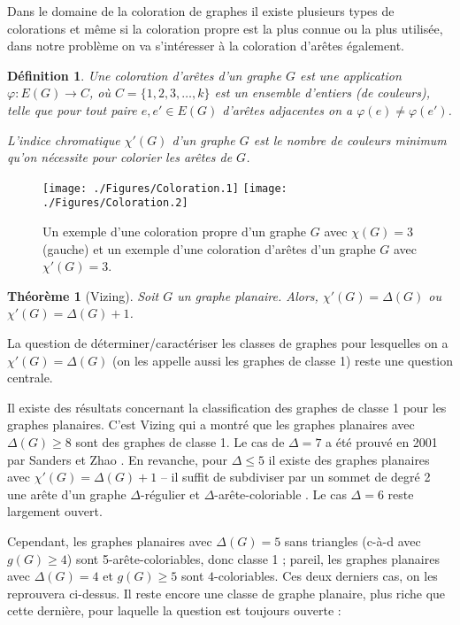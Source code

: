 \documentclass[10pt,a4paper]{article}
\newtheorem{definition}{Définition}
\newtheorem{theorem}{Théorème}
\begin{document}
Dans le domaine de la coloration de graphes il existe plusieurs types de colorations et même si la coloration propre est la plus connue ou la plus utilisée, dans notre problème on va s'intéresser à la coloration d'arêtes également.

\begin{definition}%
Une \emph{coloration d'arêtes} d'un graphe $G$ est une application $\varphi: E(G) \to C$, où $C=\{1,2,3,\dots,k\}$ est un ensemble d'entiers (de \emph{couleurs}), telle que pour tout paire $e, e' \in E(G)$ d'arêtes adjacentes on a $\varphi(e) \neq \varphi(e')$.

L'\emph{indice chromatique} $\chi'(G)$ d'un graphe $G$ est le nombre de couleurs minimum qu'on nécessite pour colorier les arêtes de $G$.
\end{definition}

\begin{figure}[ht]
\centerline{
\texttt{[image: ./Figures/Coloration.1]}
\hfil
\texttt{[image: ./Figures/Coloration.2]}
}
\caption{Un exemple d'une coloration propre d'un graphe $G$ avec $\chi(G)=3$ (gauche) et un exemple d'une coloration d'arêtes d'un graphe $G$ avec $\chi'(G)=3$.}
\label{fig:ex}
\end{figure}

\begin{theorem}[Vizing]
Soit $G$ un graphe planaire. Alors, $\chi'(G) = \Delta(G)$ ou $\chi'(G) = \Delta(G) + 1$.
\end{theorem}

La question de déterminer/caractériser les classes de graphes pour lesquelles on a $\chi'(G) = \Delta(G)$ (on les appelle aussi les graphes de classe 1) reste une question centrale. 

Il existe des résultats concernant la classification des graphes de classe 1 pour les graphes planaires.
C'est Vizing \cite{Vizing} qui a montré que les graphes planaires avec $\Delta(G)\ge 8$ sont des graphes de classe 1. Le cas de $\Delta = 7$ a été prouvé en 2001 par Sanders et Zhao \cite{SandersZhao}. 
En revanche, pour $\Delta\le 5$ il existe des graphes planaires avec $\chi'(G)=\Delta(G)+1$ -- il suffit de subdiviser par un sommet de degré 2 une arête d'un graphe $\Delta$-régulier et $\Delta$-arête-coloriable \cite{Vizing2}.
Le cas $\Delta = 6$ reste largement ouvert. 

Cependant, les graphes planaires avec $\Delta(G)=5$ sans triangles (c-à-d avec $g(G)\ge 4$) sont 5-arête-coloriables, donc classe 1 ; pareil, les graphes planaires avec $\Delta(G) = 4$ et $g(G)\ge 5$ sont $4$-coloriables. Ces deux derniers cas, on les reprouvera ci-dessus. Il reste encore une classe de graphe planaire, plus riche que cette dernière, pour laquelle la question est toujours ouverte :
\end{document}
